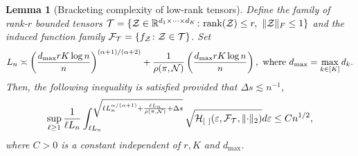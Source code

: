 \documentclass[11pt]{article}
\theoremstyle{plain}
\newtheorem{lem}{Lemma}[section]
\theoremstyle{definition}
\def\rank{\textup{rank}}
\begin{document}
\begin{lem}[Bracketing complexity of low-rank tensors] \label{lem:metric}
Define the family of rank-$r$ bounded tensors $\tT=\{\tZ\in\mathbb{R}^{d_1\times \cdots \times d_K}\colon \rank(\tZ)\leq r, \ \FnormSize{}{\tZ}\leq 1\}$ and the induced function family $\mathcal{F}_{\mathcal{T}} = \{f_{\mathcal{Z}}\colon \mathcal{Z}\in\mathcal{T}\}$.  Set 
\begin{equation}\label{eq:specification}
L_n\asymp \left({d_{\max}rK\log n \over n } \right)^{(\alpha+1)/(\alpha+2)} + {1\over \rho (\pi, \mathcal{N})}\left({d_{\max}rK\log n \over n } \right),  \text{ where } d_{\max}  = \max_{k\in[K]}d_k.
\end{equation}
 Then, the following inequality is satisfied provided that $\Delta s \lesssim n^{-1}$,
\begin{equation}\label{eq:L}
\sup_{\ell\geq 1}{1\over \ell L_n}\int^{\sqrt{\ell L_n^{\alpha/(\alpha+1)}+{\ell L_n\over \rho (\pi, \mathcal{N})}+\Delta s}}_{\ell L_n} \sqrt{\mathcal{H}_{[\ ]}(\varepsilon, \mathcal{F}_{\mathcal{T}} ,\lVert\cdot\rVert_2) }d\varepsilon \leq Cn^{1/2},
\end{equation}
where $C>0$ is a constant independent of $r,K$  and $d_{\text{max}}$.
\end{lem}
\end{document}
